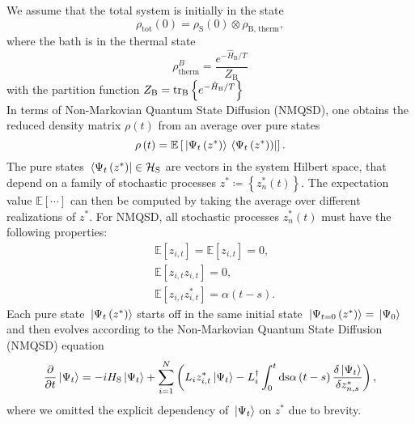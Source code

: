 We assume that the total system is initially in the state
\begin{equation*}
    \rho_\text{tot}\left(0\right) = \rho_\text{S}\left(0\right) \otimes \rho_\text{B, therm},
\end{equation*}
where the bath is in the thermal state
\begin{equation*}
    \rho_\text{therm}^{B} = \frac{e^{-\hat{H}_\text{B} / T}}{Z_\text{B}}
\end{equation*}
with the partition function $Z_\text{B} = \trace_\text{B}\left\{e^{-\hat{H}_\text{B} / T}\right\}$
\\
In terms of Non-Markovian Quantum State Diffusion (NMQSD), one obtains the reduced density matrix
$\rho\left(t\right)$ from an average over pure states
\begin{equation}
    \label{eq:averaging_states_linear}
    \rho\left(t\right) = \mathbb{E}\left[\ket*{\Psi_t\left(z^*\right)}\bra*{\Psi_t\left(z^*)\right)}\right].
\end{equation}
The pure states $\bra*{\Psi_t\left(z^*\right)} \in \mathcal{H}_\text{S}$ are vectors in the system
Hilbert space, that depend on a family of stochastic processes $z^*\coloneqq\left\{z^*_n\left(t\right)\right\}$.
The expectation value $\mathbb{E}\left[\cdots\right]$ can then be computed by taking the
average over different realizations of $z^*$. For NMQSD, all stochastic processes $z_n^*\left(t\right)$ must
have the following properties:
\begin{subequations}
    \label{eq:optim}
    \begin{align}
            & \mathbb{E}\left[z_{i,t}\right]=\mathbb{E}\left[z_{i,t}\right]=0 \label{eq:cost},\\
            & \mathbb{E}\left[z_{i,t}z_{i,t}\right]=0, \label{eq:const1}\\
            & \mathbb{E}\left[z_{i,t}z_{i,t}^*\right]=\alpha\left(t-s\right). \label{eq:const2}
    \end{align}
\end{subequations}
Each pure state $\ket*{\Psi_t\left(z^*\right)}$ starts off in the same initial state
$\ket*{\Psi_{t=0}\left(z^*\right)}=\ket*{\Psi_0}$ and then evolves according
to the Non-Markovian Quantum State Diffusion (NMQSD) equation \cite{Diosi:1997,Diosi:1998}
\begin{equation}
    \label{eq:non_markovian_schroedinger_equation}
    \frac{\partial}{\partial t} \ket*{\Psi_t} = -iH_\text{S} \ket*{\Psi_t}
    + \sum_{i=1}^{N} \left( L_i z_{i,t}^* \ket*{\Psi_t}
    - L_i^\dagger \int_0^t \text{ds} \alpha\left(t-s\right) 
    \frac{\delta \ket*{\Psi_t}}{\delta z_{n,s}^*} \right),
\end{equation}
where we omitted the explicit dependency of $\ket*{\Psi_t}$ on $z^*$ due to brevity.